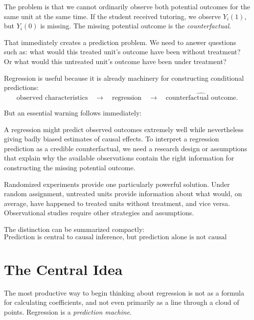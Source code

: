 \documentclass[11pt]{report}
\begin{document}
The problem is that we cannot ordinarily observe both potential outcomes for the same unit at the same time. If the student received tutoring, we observe \(Y_i(1)\), but \(Y_i(0)\) is missing. The missing potential outcome is the \emph{counterfactual}.

That immediately creates a prediction problem. We need to answer questions such as: what would this treated unit's outcome have been without treatment? Or what would this untreated unit's outcome have been under treatment?

Regression is useful because it is already machinery for constructing conditional predictions:
\[
\text{observed characteristics}
\quad\longrightarrow\quad
\text{regression}
\quad\longrightarrow\quad
\widehat{\text{counterfactual outcome}}.
\]

But an essential warning follows immediately:

\begin{center}
\end{center}

A regression might predict observed outcomes extremely well while nevertheless giving badly biased estimates of causal effects. To interpret a regression prediction as a credible counterfactual, we need a research design or assumptions that explain why the available observations contain the right information for constructing the missing potential outcome.

Randomized experiments provide one particularly powerful solution. Under random assignment, untreated units provide information about what would, on average, have happened to treated units without treatment, and vice versa. Observational studies require other strategies and assumptions.

The distinction can be summarized compactly:
\[
\boxed{
\text{Prediction is central to causal inference, but prediction alone is not causal inference.}
}
\]

\section{The Central Idea}

The most productive way to begin thinking about regression is not as a formula for calculating coefficients, and not even primarily as a line through a cloud of points. Regression is a \emph{prediction machine}.
\end{document}
